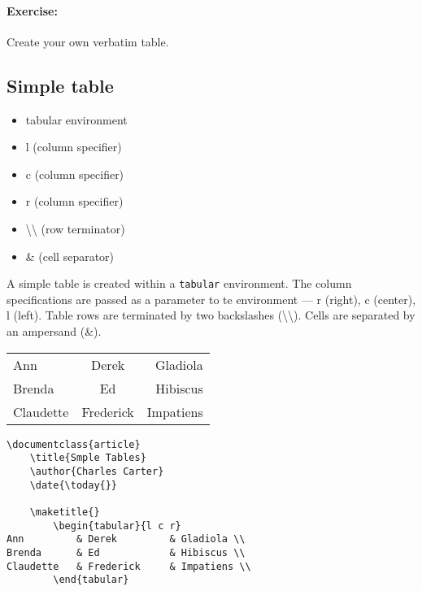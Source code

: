         \paragraph{Exercise:} Create your own verbatim table.

        \subsection{Simple table}
        \label{Simple table}
        
        \begin{framed}
            \begin{itemize}
                \item{tabular environment}
                \item{l (column specifier)}
                \item{c (column specifier)}
                \item{r (column specifier)}
                \item{\textbackslash\textbackslash{} (row terminator)}
                \item{\& (cell separator)}
            \end{itemize}
        \end{framed}

        A simple \Lx{} table is created within a \texttt{tabular} environment. The column specifications are passed as a parameter to te environment --- r (right), c (center), l (left). Table rows are terminated by two backslashes (\textbackslash\textbackslash). Cells are separated by an ampersand (\&).

        \begin{tabular}{l c r}
Ann &  Derek &   Gladiola \\
Brenda &  Ed &   Hibiscus \\
Claudette &  Frederick &   Impatiens \\
        \end{tabular}


        \begin{verbatim}
\documentclass{article}
    \title{Smple Tables}
    \author{Charles Carter}
    \date{\today{}}
 
    \maketitle{}
        \begin{tabular}{l c r}
Ann         & Derek         & Gladiola \\
Brenda      & Ed            & Hibiscus \\
Claudette   & Frederick     & Impatiens \\
        \end{tabular}
    
        \end{verbatim}


